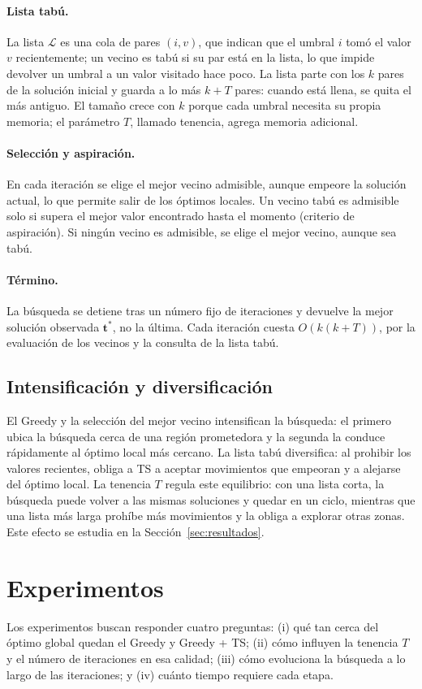 \documentclass[letter, 10pt]{article}
\begin{document}
\paragraph{Lista tabú.} La lista $\mathcal{L}$ es una cola de pares $(i, v)$, que indican que el umbral $i$ tomó el valor $v$ recientemente; un vecino es tabú si su par está en la lista, lo que impide devolver un umbral a un valor visitado hace poco. La lista parte con los $k$ pares de la solución inicial y guarda a lo más $k + T$ pares: cuando está llena, se quita el más antiguo. El tamaño crece con $k$ porque cada umbral necesita su propia memoria; el parámetro $T$, llamado tenencia, agrega memoria adicional.

\paragraph{Selección y aspiración.} En cada iteración se elige el mejor vecino admisible, aunque empeore la solución actual, lo que permite salir de los óptimos locales. Un vecino tabú es admisible solo si supera el mejor valor encontrado hasta el momento (criterio de aspiración). Si ningún vecino es admisible, se elige el mejor vecino, aunque sea tabú.

\paragraph{Término.} La búsqueda se detiene tras un número fijo de iteraciones y devuelve la mejor solución observada $\mathbf{t}^*$, no la última. Cada iteración cuesta $O(k(k + T))$, por la evaluación de los vecinos y la consulta de la lista tabú.

\subsection{Intensificación y diversificación}
El Greedy y la selección del mejor vecino intensifican la búsqueda: el primero ubica la búsqueda cerca de una región prometedora y la segunda la conduce rápidamente al óptimo local más cercano. La lista tabú diversifica: al prohibir los valores recientes, obliga a TS a aceptar movimientos que empeoran y a alejarse del óptimo local. La tenencia $T$ regula este equilibrio: con una lista corta, la búsqueda puede volver a las mismas soluciones y quedar en un ciclo, mientras que una lista más larga prohíbe más movimientos y la obliga a explorar otras zonas. Este efecto se estudia en la Sección~\ref{sec:resultados}.

\section{Experimentos}
\label{sec:experimentos}
Los experimentos buscan responder cuatro preguntas: (i) qué tan cerca del óptimo global quedan el Greedy y Greedy + TS; (ii) cómo influyen la tenencia $T$ y el número de iteraciones en esa calidad; (iii) cómo evoluciona la búsqueda a lo largo de las iteraciones; y (iv) cuánto tiempo requiere cada etapa.
\end{document}
